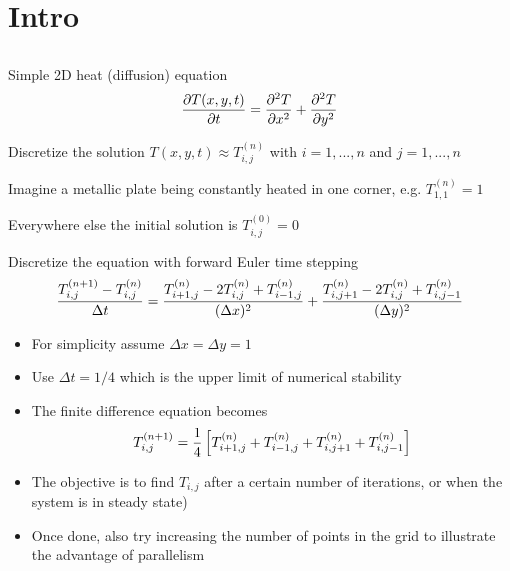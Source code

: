 \section{Intro}
\subsection{} %

\newcommand{\tnij}{\ensuremath{T^{(n)}_{i,j}}}

\begin{frame}{}
  \begin{itemize}\setlength{\itemsep}{3mm}
    \item Simple 2D heat (diffusion) equation
    \[
      {\partial T(x,y,t)\over\partial t}={\partial^2 T\over\partial x^2}+{\partial^2 T\over\partial y^2}
    \]
    {\footnotesize
      \item Discretize the solution $T(x,y,t)\approx T^{(n)}_{i,j}$ with $i=1,...,n$ and $j=1,...,n$
      \item Imagine a metallic plate being constantly heated in one corner, e.g. $T^{(n)}_{1,1}=1$
      \item Everywhere else the initial solution is $T^{(0)}_{i,j}=0$}
    \item Discretize the equation with forward Euler time stepping
    \[
      {T^{(n+1)}_{i,j}-\tnij\over\Delta t}=
      {T^{(n)}_{i+1,j}-2T^{(n)}_{i,j}+T^{(n)}_{i-1,j}\over(\Delta x)^2}+
      {T^{(n)}_{i,j+1}-2T^{(n)}_{i,j}+T^{(n)}_{i,j-1}\over(\Delta y)^2}
    \]
  \end{itemize}
\end{frame}

\begin{frame}{}
  \begin{itemize}\setlength{\itemsep}{3mm}
    \item For simplicity assume $\Delta x=\Delta y=1$
    \item Use $\Delta t=1/4$ which is the upper limit of numerical stability
    \item The finite difference equation becomes
    \[
      T^{(n+1)}_{i,j} = {1\over4}\left[T^{(n)}_{i+1,j}+T^{(n)}_{i-1,j}+T^{(n)}_{i,j+1}+T^{(n)}_{i,j-1}\right]
    \]
    \item The objective is to find $T_{i,j}$ after a
    certain number of iterations, or when the system is in steady state)
    \item Once done, also try increasing the number of points in the grid to illustrate the advantage of
    parallelism
  \end{itemize}
\end{frame}
